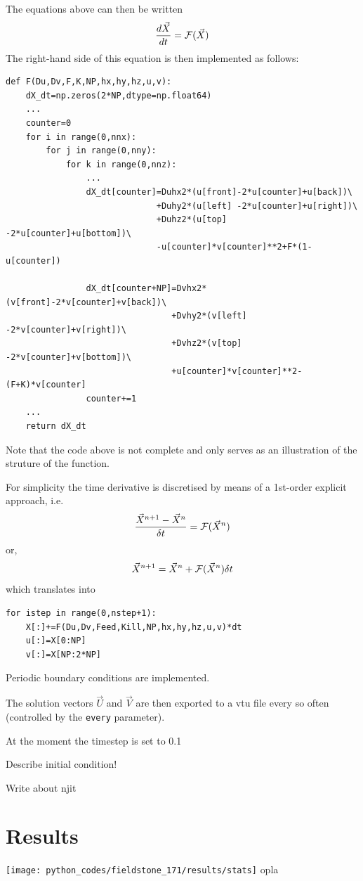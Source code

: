 The equations above can then be written 
\[
\frac{d\vec{X}}{dt} 
= {\cal F} (\vec{X})
\]
The right-hand side of this equation is then implemented as follows:
\begin{lstlisting}
def F(Du,Dv,F,K,NP,hx,hy,hz,u,v):
    dX_dt=np.zeros(2*NP,dtype=np.float64)
    ...
    counter=0
    for i in range(0,nnx):
        for j in range(0,nny):
            for k in range(0,nnz):
                ...
                dX_dt[counter]=Duhx2*(u[front]-2*u[counter]+u[back])\
                              +Duhy2*(u[left] -2*u[counter]+u[right])\
                              +Duhz2*(u[top]  -2*u[counter]+u[bottom])\
                              -u[counter]*v[counter]**2+F*(1-u[counter])

                dX_dt[counter+NP]=Dvhx2*(v[front]-2*v[counter]+v[back])\
                                 +Dvhy2*(v[left] -2*v[counter]+v[right])\
                                 +Dvhz2*(v[top]  -2*v[counter]+v[bottom])\
                                 +u[counter]*v[counter]**2-(F+K)*v[counter]
                counter+=1
    ...
    return dX_dt
\end{lstlisting}
Note that the code above is not complete and only serves as an 
illustration of the struture of the function.

For simplicity the time derivative is discretised by means of a 1st-order
explicit approach, i.e.
\[
\frac{\vec{X}^{n+1} -\vec{X}^{n} }{\delta t} = {\cal F} (\vec{X}^n)
\]
or, 
\[
\vec{X}^{n+1}
=
\vec{X}^{n} + {\cal F} (\vec{X}^n) \delta t
\]
which translates into
\begin{lstlisting}
for istep in range(0,nstep+1):
    X[:]+=F(Du,Dv,Feed,Kill,NP,hx,hy,hz,u,v)*dt
    u[:]=X[0:NP]
    v[:]=X[NP:2*NP]
\end{lstlisting}
Periodic boundary conditions are implemented.

The solution vectors $\vec{U}$ and $\vec{V}$ are then exported to 
a vtu file every so often (controlled by the \lstinline{every} parameter).

At the moment the timestep is set to 0.1

Describe initial condition!

Write about njit

\newpage
\section*{Results}

\begin{center}
\texttt{[image: python\_codes/fieldstone\_171/results/stats]}
{\captionfont opla}
\end{center}

